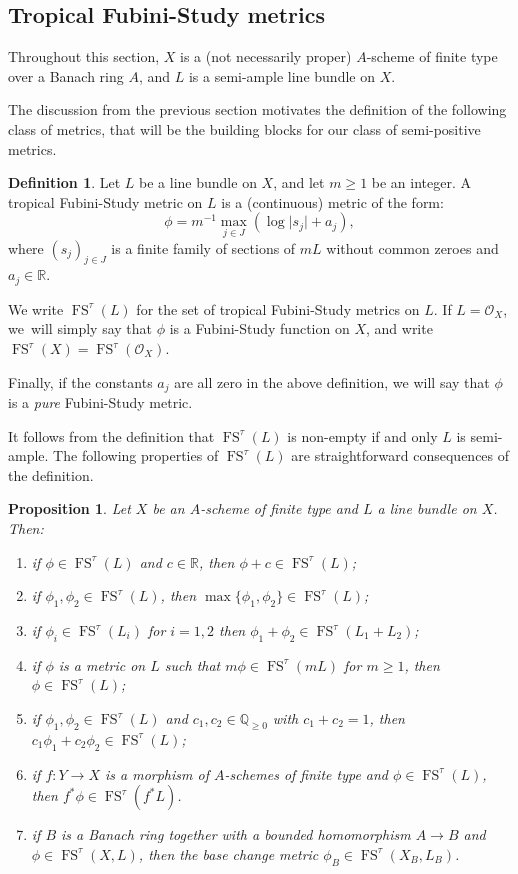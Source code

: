 \documentclass[JEP,XML,SOM,Unicode,published]{cedram}
\newtheorem{prop}[equation]{Proposition}
\theoremstyle{definition}
\newtheorem{defn}[equation]{Definition}
\newcommand \Q{\mathbb Q}
\newcommand \R{\mathbb R}
\newcommand \gO {\mathcal O}
\DeclareMathOperator{\FS}{FS}
\begin{document}
\subsection{Tropical Fubini-Study metrics}
Throughout this section, $X$ is a (not necessarily proper) $A$-scheme of finite type over a Banach ring $A$, and $L$ is a semi-ample line bundle on $X$.

The discussion from the previous section motivates the definition of the following class of metrics, that will be the building blocks for our class of semi-positive metrics.
\begin{defn}
Let $L$ be a line bundle on $X$, and let $m \ge 1$ be an integer. A tropical Fubini-Study metric on $L$ is a (continuous) metric of the form:\vspace*{-3pt}
\[
\phi = m^{-1} \max_{j \in J} (\log \lvert s_j \rvert + a_j),
\]
where $(s_j)_{j \in J}$ is a finite family of sections of $mL$ without common zeroes and $a_j \in \R$.

We write $\FS^{\tau}(L)$ for the set of tropical Fubini-Study metrics on $L$.
If $L\!=\! \gO_X$, we~will simply say that $\phi$ is a Fubini-Study function on $X$, and write $\FS^{\tau}(X) \!=\! \FS^{\tau}(\gO_X)$.

Finally, if the constants $a_j$ are all zero in the above definition, we will say that $\phi$ is a \emph{pure} Fubini-Study metric.
\end{defn}
It follows from the definition that $\FS^{\tau}(L)$ is non-empty if and only $L$ is semi-ample.
The following properties of $\FS^{\tau}(L)$ are straightforward consequences of the definition.
\begin{prop}
\label{prop.FS}
Let $X$ be an $A$-scheme of finite type and $L$ a line bundle on $X$. Then:
\begin{enumerate}
\item if $\phi \in \FS^{\tau}(L)$ and $c \in \R$, then $\phi +c \in \FS^{\tau}(L)$;
\item if $\phi_1, \phi_2 \in \FS^{\tau}(L)$, then $\max \{ \phi_1, \phi_2 \} \in \FS^{\tau}(L)$;
\item if $\phi_i \in \FS^{\tau}(L_i)$ for $i=1,2$ then $\phi_1 + \phi_2 \in \FS^{\tau}(L_1 +L_2)$;
\item if $\phi$ is a metric on $L$ such that $m\phi \in \FS^{\tau}(mL)$ for $m \ge 1$, then $\phi \in \FS^{\tau}(L)$;
\item if $\phi_1, \phi_2 \in \FS^{\tau}(L)$ and $c_1, c_2 \in \Q_{\ge 0}$ with $c_1+c_2=1$, then $c_1 \phi_1 + c_2 \phi_2 \in \FS^{\tau}(L)$;
\item if $f: Y \to X$ is a morphism of $A$-schemes of finite type and $\phi \in \FS^{\tau}(L)$, then $f^*\phi \in \FS^{\tau}(f^*L)$.
\item if $B$ is a Banach ring together with a bounded homomorphism $A \to B$ and $\phi \in \FS^{\tau}(X, L)$, then the base change metric $\phi_B \in \FS^{\tau}(X_B, L_B)$.
\end{enumerate}
\end{prop}
\end{document}
